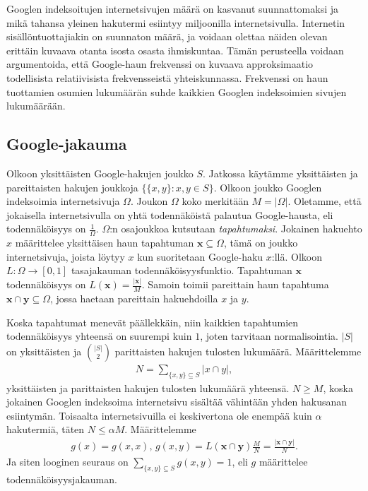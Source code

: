 \documentclass[12pt,finnish]{tktltiki2}
\theoremstyle{definition}
\theoremstyle{remark}
\begin{document}
    Googlen indeksoitujen internetsivujen määrä on kasvanut suunnattomaksi ja mikä tahansa yleinen hakutermi esiintyy miljoonilla internetsivulla. Internetin sisällöntuottajiakin on suunnaton määrä, ja voidaan olettaa näiden olevan erittäin kuvaava otanta isosta osasta ihmiskuntaa.
    Tämän perusteella voidaan argumentoida, että Google-haun frekvenssi on kuvaava approksimaatio todellisista relatiivisista frekvensseistä yhteiskunnassa.
    Frekvenssi on haun tuottamien osumien lukumäärän suhde kaikkien Googlen indeksoimien sivujen lukumäärään. \cite{cilibrasi2007google}

    \subsection{Google-jakauma} %
    \label{sub:google_jakauma}
      Olkoon yksittäisten Google-hakujen joukko $S$.
      Jatkossa käytämme yksittäisten ja pareittaisten hakujen joukkoja $\{\{x,y\}:x,y \in S\}$.
      Olkoon joukko Googlen indeksoimia internetsivuja $\Omega$.
      Joukon $\Omega$ koko merkitään $M = |\Omega|$.
      Oletamme, että jokaisella internetsivulla on yhtä todennäköistä palautua Google-hausta, eli todennäköisyys on $\frac{1}{\Omega}$.
      $\Omega$:n osajoukkoa kutsutaan \emph{tapahtumaksi}.
      Jokainen hakuehto $x$ määrittelee yksittäisen haun tapahtuman $\mathbf{x}\subseteq \Omega$, tämä on joukko internetsivuja, joista löytyy $x$ kun suoritetaan Google-haku $x$:llä.
      Olkoon $L: \Omega \rightarrow [0,1]$ tasajakauman todennäköisyysfunktio.
      Tapahtuman $\mathbf{x}$ todennäköisyys on $L(\mathbf{x}) = \frac{|\mathbf{x}|}{M}$.
      Samoin toimii pareittain haun tapahtuma $\mathbf{x}\cap\mathbf{y}\subseteq\Omega$, jossa haetaan pareittain hakuehdoilla $x$ ja $y$.

      Koska tapahtumat menevät päällekkäin, niin kaikkien tapahtumien todennäköisyys yhteensä on suurempi kuin $1$, joten tarvitaan normalisointia.
      $|S|$ on yksittäisten ja $\binom{|S|}{2}$ parittaisten hakujen tulosten lukumäärä.
      Määrittelemme
      \begin{align}
        N = \sum_{\{x,y\} \subseteq S} |x \cap y|,
      \end{align}
      yksittäisten ja parittaisten hakujen tulosten lukumäärä yhteensä.
      $N \geq M$, koska jokainen Googlen indeksoima internetsivu sisältää vähintään yhden hakusanan esiintymän. Toisaalta internetsivuilla ei keskivertona ole enempää kuin $\alpha$ hakutermiä, täten $N \leq \alpha{}M$.
      Määrittelemme
      \begin{align}
        g(x) = g(x,x),\, g(x,y) = L(\mathbf{x} \cap \mathbf{y})\frac{M}{N} = \frac{|\mathbf{x}\cap \mathbf{y}|}{N}.
      \end{align}
      Ja siten looginen seuraus on $\sum_{\{x,y\}\subseteq S} g(x,y) = 1$, eli $g$ määrittelee todennäköisyysjakauman.
\end{document}

